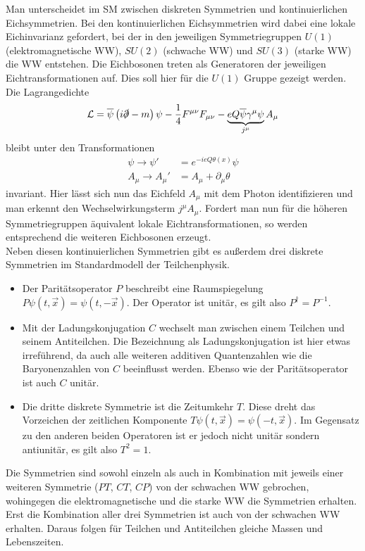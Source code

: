Man unterscheidet im SM zwischen diskreten Symmetrien und kontinuierlichen Eichsymmetrien. Bei den kontinuierlichen Eichsymmetrien wird dabei eine lokale Eichinvarianz gefordert, bei der in den jeweiligen Symmetriegruppen $U(1)$ (elektromagnetische WW), $SU(2)$ (schwache WW) und $SU(3)$ (starke WW) die WW entstehen. Die Eichbosonen treten als Generatoren der jeweiligen Eichtransformationen auf. Dies soll hier für die $U(1)$ Gruppe gezeigt werden. Die Lagrangedichte 
\begin{equation}
\mathcal{L}=\overline{\psi}\left(i\slashed{\partial}-m\right)\psi-\frac{1}{4}F^{\mu\nu}F_{\mu\nu}-\underbrace{eQ\overline{\psi}\gamma^\mu\psi}_{j^\mu} A_\mu
\end{equation}
bleibt  unter den Transformationen
\begin{align}
\psi\rightarrow\psi'&=e^{-ieQ\theta(x)}\psi\\
A_\mu\rightarrow A_\mu'&=A_\mu+\partial_\mu\theta
\end{align}
invariant. Hier lässt sich nun das Eichfeld $A_\mu$ mit dem Photon identifizieren und man erkennt den Wechselwirkungsterm $j^\mu A_\mu$. Fordert man nun für die höheren Symmetriegruppen äquivalent lokale Eichtransformationen, so werden entsprechend die weiteren Eichbosonen erzeugt.\\
Neben diesen kontinuierlichen Symmetrien gibt es außerdem drei diskrete Symmetrien im Standardmodell der Teilchenphysik.
\begin{itemize}
\item Der Paritätsoperator $P$ beschreibt eine Raumspiegelung $P\psi(t,\vec{x})=\psi(t,-\vec{x})$. Der Operator ist unitär, es gilt also $P^\dagger=P^{-1}$.
\item Mit der Ladungskonjugation $C$ wechselt man zwischen einem Teilchen und seinem Antiteilchen. Die Bezeichnung als Ladungskonjugation ist hier etwas irreführend, da auch alle weiteren additiven Quantenzahlen wie die Baryonenzahlen von $C$ beeinflusst werden. Ebenso wie der Paritätsoperator ist auch $C$ unitär.
\item Die dritte diskrete Symmetrie ist die Zeitumkehr $T$. Diese dreht das Vorzeichen der zeitlichen Komponente $T\psi(t,\vec{x})=\psi(-t,\vec{x})$. Im Gegensatz zu den anderen beiden Operatoren ist er jedoch nicht unitär sondern antiunitär, es gilt also $T^2=1$.
\end{itemize}
Die Symmetrien sind sowohl einzeln als auch in Kombination mit jeweils einer weiteren Symmetrie ($P\!T$, $C\!T$, $C\!P$) von der schwachen WW gebrochen, wohingegen die elektromagnetische und die starke WW die Symmetrien erhalten. Erst die Kombination \CPT aller drei Symmetrien ist auch von der schwachen WW erhalten. Daraus folgen für Teilchen und Antiteilchen gleiche Massen und Lebenszeiten.

